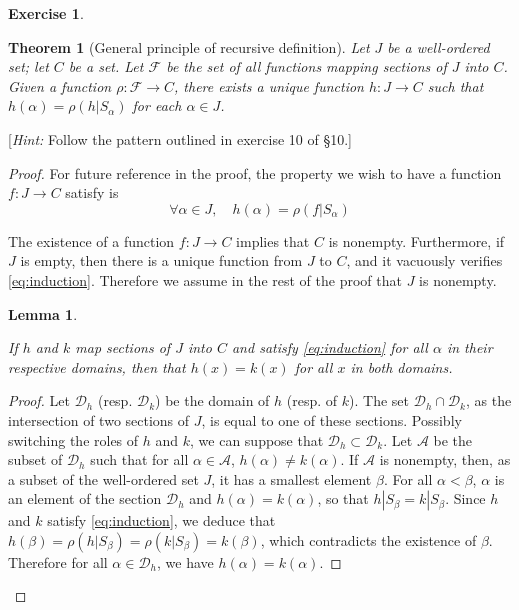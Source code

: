 \documentclass[11pt,a4paper,twoside]{article}
\theoremstyle{definition}
\newcounter{excounter}
\newtheorem{exercise}[excounter]{Exercise}
\theoremstyle{plain}
\newtheorem*{theorem}{Theorem}
\newtheorem{lemma}{Lemma}
\begin{document}
\begin{exercise}

  \begin{theorem}[General principle of recursive definition]
    Let $J$ be a well-ordered set; let $C$ be a set.
    Let $\mathscr{F}$ be the set of all functions mapping sections of $J$ into $C$. Given a function
    $\rho : \mathscr{F} \to C$, there exists a unique function $h : J \to C$ such that
    $h ( \alpha ) = \rho ( h | S_\alpha )$ for each $\alpha \in J$.

  \end{theorem}
  [\emph{Hint:} Follow the pattern outlined in exercise 10 of \S 10.]

\end{exercise}

\begin{proof}

  For future reference in the proof, the property we wish to have a function $f : J \to C$ satisfy is
  \begin{equation} \label{eq:induction}
    \forall \alpha \in J, \quad h ( \alpha ) = \rho ( f | S_\alpha )
  \end{equation}

  The existence of a function $f : J \to C$ implies that $C$ is nonempty.
  Furthermore, if $J$ is empty, then there is a unique function from $J$ to $C$, and it vacuously
  verifies \eqref{eq:induction}. Therefore we assume in the rest of the proof that $J$ is nonempty.

\begin{lemma} \label{lemma:unicity}

  If $h$ and $k$ map sections of $J$ into $C$ and satisfy \eqref{eq:induction}
  for all $\alpha$ in their respective domains, then that $h ( x ) = k ( x )$ for all $x$ in both domains.

\end{lemma}

\begin{proof}

  Let $\mathscr{D}_h$ (resp. $\mathscr{D}_k$) be the domain of $h$ (resp. of $k$). The set $\mathscr{D}_h \cap \mathscr{D}_k$,
  as the intersection of two sections of $J$, is equal to one of these sections. Possibly switching the roles
  of $h$ and $k$, we can suppose that $\mathscr{D}_h \subset \mathscr{D}_k$.
  Let $\mathscr{A}$ be the subset of $\mathscr{D}_h$ such that for all $\alpha \in \mathscr{A}$, $h ( \alpha ) \neq k ( \alpha )$.
  If $\mathscr{A}$ is nonempty, then, as a subset of the well-ordered set $J$, it has a smallest element $\beta$.
  For all $\alpha < \beta$, $\alpha$ is an element of the section $\mathscr{D}_h$ and $h ( \alpha ) = k ( \alpha )$,
  so that $h | S_\beta = k | S_\beta$. Since $h$ and $k$ satisfy \eqref{eq:induction}, we deduce that
  $h ( \beta ) = \rho ( h | S_\beta ) = \rho ( k | S_\beta ) = k ( \beta )$, which contradicts the existence of $\beta$.
  Therefore for all $\alpha \in \mathscr{D}_h$, we have $h ( \alpha ) = k ( \alpha )$.


\end{proof}
\end{proof}
\end{document}
